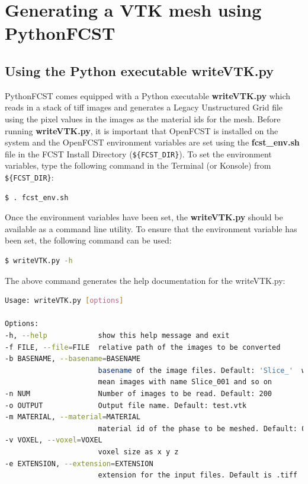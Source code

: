 \section{Generating a VTK mesh using PythonFCST}

\subsection{Using the Python executable writeVTK.py}

PythonFCST comes equipped with a Python executable \textbf{writeVTK.py} which reads in a stack of tiff images and generates a Legacy Unstructured Grid file using the pixel values in the images as the material ids for the mesh. Before running \textbf{writeVTK.py}, it is important that OpenFCST is installed on the system and the OpenFCST environment variables are set using the \textbf{fcst\_env.sh} file in the FCST Install Directory (\verb!${FCST_DIR}!). To set the environment variables, type the following command in the Terminal (or Konsole) from \verb!${FCST_DIR}!:

\begin{lstlisting}[language=bash]
$ . fcst_env.sh
\end{lstlisting}

Once the environment variables have been set, the \textbf{writeVTK.py} should be available as a command line utility. To ensure that the environment variable has been set, the following command can be used:

\begin{lstlisting}[language=bash]
$ writeVTK.py -h
\end{lstlisting}

\noindent The above command generates the help documentation for the writeVTK.py:

\begin{lstlisting}[language=bash]
Usage: writeVTK.py [options]

Options:
-h, --help            show this help message and exit
-f FILE, --file=FILE  relative path of the images to be converted
-b BASENAME, --basename=BASENAME
                      basename of the image files. Default: 'Slice_'  would
                      mean images with name Slice_001 and so on
-n NUM                Number of images to be read. Default: 200
-o OUTPUT             Output file name. Default: test.vtk
-m MATERIAL, --material=MATERIAL
                      material id of the phase to be meshed. Default: 0
-v VOXEL, --voxel=VOXEL
                      voxel size as x y z
-e EXTENSION, --extension=EXTENSION
                      extension for the input files. Default is .tiff
\end{lstlisting}


